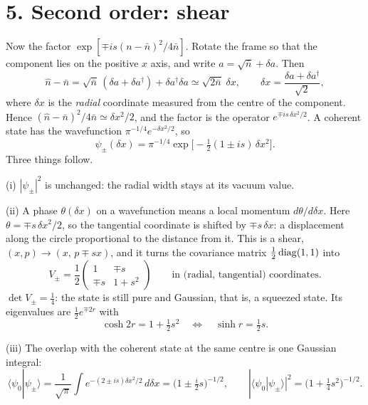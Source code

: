 \documentclass[11pt,letterpaper]{article}
\newcommand{\nbar}{\bar{n}}
\newcommand{\braket}[2]{\langle#1|#2\rangle}
\begin{document}
\section*{5. Second order: shear}
Now the factor $\exp[\mp is(n-\nbar)^2/4\nbar]$. Rotate the frame so that the component lies on the
positive $x$ axis, and write $a=\sqrt{\nbar}+\delta a$. Then
\[
\hat n-\nbar=\sqrt{\nbar}\,(\delta a+\delta a^\dagger)+\delta a^\dagger\delta a\simeq\sqrt{2\nbar}\;\delta x,
\qquad \delta x=\frac{\delta a+\delta a^\dagger}{\sqrt2},
\]
where $\delta x$ is the \emph{radial} coordinate measured from the centre of the component. Hence
$(\hat n-\nbar)^2/4\nbar\simeq\delta x^2/2$, and the factor is the operator $e^{\mp is\,\delta x^2/2}$. A
coherent state has the wavefunction $\pi^{-1/4}e^{-\delta x^2/2}$, so
\begin{equation}\label{e11}
\psi_\pm(\delta x)=\pi^{-1/4}\exp\bigl[-\tfrac12(1\pm is)\,\delta x^2\bigr].
\end{equation}
Three things follow.

(i) $|\psi_\pm|^2$ is unchanged: the radial width stays at its vacuum value.

(ii) A phase $\theta(\delta x)$ on a wavefunction means a local momentum $d\theta/d\delta x$. Here
$\theta=\mp s\,\delta x^2/2$, so the tangential coordinate is shifted by $\mp s\,\delta x$: a
displacement along the circle proportional to the distance from it. This is a shear,
$(x,p)\to(x,\,p\mp sx)$, and it turns the covariance matrix $\tfrac12\,{\rm diag}(1,1)$ into
\begin{equation}\label{e12}
V_\pm=\frac12\begin{pmatrix}1&\mp s\\ \mp s&1+s^2\end{pmatrix}\qquad\text{in (radial, tangential) coordinates.}
\end{equation}
$\det V_\pm=\tfrac14$: the state is still pure and Gaussian, that is, a squeezed state. Its
eigenvalues are $\tfrac12e^{\mp2r}$ with
\begin{equation}\label{e13}
\cosh2r=1+\tfrac12s^2\quad\Longleftrightarrow\quad\sinh r=\tfrac12 s .
\end{equation}

(iii) The overlap with the coherent state at the same centre is one Gaussian integral:
\begin{equation}\label{e14}
\braket{\psi_0}{\psi_\pm}=\frac{1}{\sqrt\pi}\int e^{-(2\pm is)\delta x^2/2}\,d\delta x=\bigl(1\pm\tfrac{i}{2}s\bigr)^{-1/2},
\qquad|\braket{\psi_0}{\psi_\pm}|^2=\bigl(1+\tfrac14s^2\bigr)^{-1/2}.
\end{equation}
\end{document}

